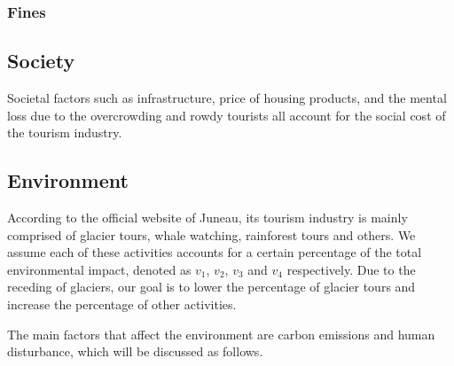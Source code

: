 \subsubsection{Fines}





\subsection{Society}

Societal factors such as infrastructure, price of housing products, and the mental
loss due to the overcrowding and rowdy tourists all account for the social cost of the tourism industry.

\subsection{Environment}

According to the official website of Juneau, its tourism industry is 
mainly comprised of glacier tours, whale watching, rainforest tours and others.
We assume each of these activities accounts for a certain percentage of the total environmental impact,
denoted as $v_1$, $v_2$, $v_3$ and $v_4$ respectively. Due to the receding of glaciers,
our goal is to lower the percentage of glacier tours and increase the percentage of other activities.

The main factors that affect the environment are carbon emissions and human disturbance, which will be discussed as follows.